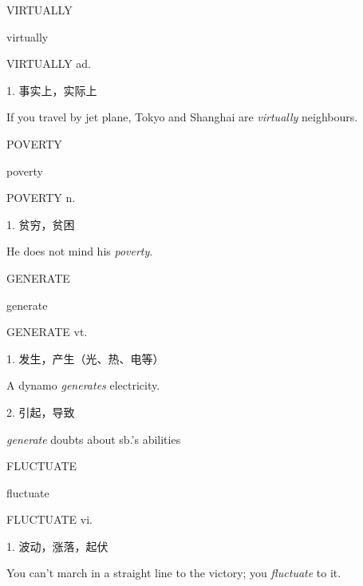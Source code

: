 \begin{flashcard}{
VIRTUALLY

virtually
}
\begin{center}
VIRTUALLY ad. 
\end{center}
1. 事实上，实际上

If you travel by jet plane, Tokyo and Shanghai are \textit{virtually} neighbours.

\end{flashcard}
\begin{flashcard}{
POVERTY

poverty
}
\begin{center}
POVERTY n. 
\end{center}
1. 贫穷，贫困

He does not mind his \textit{poverty}.

\end{flashcard}
\begin{flashcard}{
GENERATE

generate
}
\begin{center}
GENERATE vt. 
\end{center}
1. 发生，产生（光、热、电等）

A dynamo \textit{generates} electricity.

2. 引起，导致

\textit{generate} doubts about sb.'s abilities

\end{flashcard}
\begin{flashcard}{
FLUCTUATE

fluctuate
}
\begin{center}
FLUCTUATE vi. 
\end{center}
1. 波动，涨落，起伏

You can't march in a straight line to the victory; you \textit{fluctuate} to it.

\end{flashcard}
